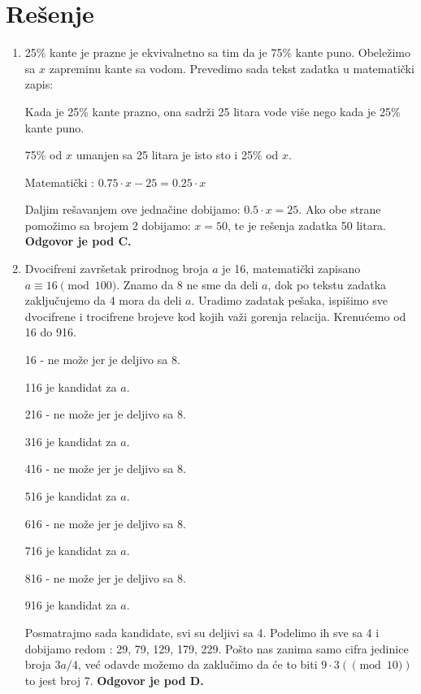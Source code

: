 \documentclass[a4paper,12pt]{report}
\begin{document}

\newpage

\section{Re\v{s}enje}
\begin{enumerate}[1.]

\item 25\% kante je prazne je ekvivalnetno sa tim da je 75\% kante puno. Obele\v{z}imo sa $x$ zapreminu kante sa vodom. Prevedimo sada tekst zadatka u matemati\v{c}ki zapis:
\par Kada je 25\% kante prazno, ona sadr\v{z}i 25 litara vode vi\v{s}e nego kada je 25\% kante puno.
\par 75\% od $x$ umanjen sa 25 litara je isto sto i 25\% od $x$.
\par Matemati\v{c}ki : $ 0.75 \cdot x - 25 = 0.25 \cdot x$
\par Daljim re\v{s}avanjem ove jedna\v{c}ine dobijamo: $ 0.5 \cdot x = 25$. Ako obe strane pomo\v{z}imo sa brojem 2 dobijamo: $x = 50$, te je re\v{s}enja zadatka 50 litara. \textbf{Odgovor je pod C.}

\item Dvocifreni zavr\v{s}etak prirodnog broja $a$ je 16, matemati\v{c}ki zapisano $ a \equiv 16 \pmod{100}$. Znamo da 8 ne sme da deli $a$, dok po tekstu zadatka zaklju\v{c}ujemo da 4 mora da deli $a$. Uradimo zadatak pe\v{s}aka, ispi\v{s}imo sve dvocifrene i trocifrene brojeve kod kojih va\v{z}i gorenja relacija. Krenu\'{c}emo od 16 do 916.
\par 16 - ne mo\v{z}e jer je deljivo sa 8.
\par 116 je kandidat za $a$.
\par 216 - ne mo\v{z}e jer je deljivo sa 8.
\par 316 je kandidat za $a$.
\par 416 - ne mo\v{z}e jer je deljivo sa 8.
\par 516 je kandidat za $a$.
\par 616 - ne mo\v{z}e jer je deljivo sa 8.
\par 716 je kandidat za $a$.
\par 816 - ne mo\v{z}e jer je deljivo sa 8.
\par 916 je kandidat za $a$.
\par Posmatrajmo sada kandidate, svi su deljivi sa 4. Podelimo ih sve sa 4 i dobijamo redom : 29, 79, 129, 179, 229. Po\v{s}to nas zanima samo cifra jedinice broja $3a/4$, ve\'{c} odavde mo\v{z}emo da zaklu\v{c}imo da \'{c}e to biti $9 \cdot 3 (\pmod 10)$ to jest broj 7. \textbf{Odgovor je pod D.}


\end{enumerate}
\end{document}
